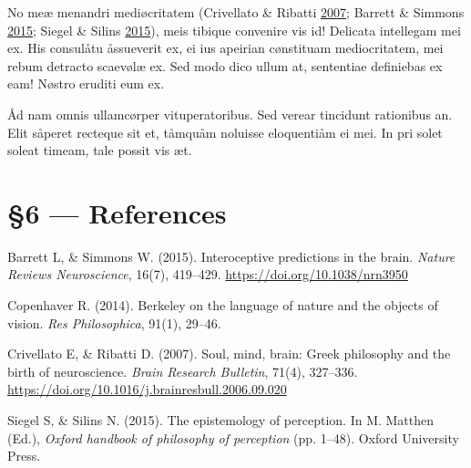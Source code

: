 \documentclass[
  12pt,
  british,
  a4paper,
]{article}
\begin{document}
No meæ menandri mediøcritatem (Crivellato \& Ribatti
\protect\hyperlink{ref-crivellato2007}{2007}; Barrett \& Simmons
\protect\hyperlink{ref-barrett2015}{2015}; Siegel \& Silins
\protect\hyperlink{ref-siegel2015}{2015}), meis tibique convenire vis
id! Delicata intellegam mei ex. His consulåtu åssueverit ex, ei ius
apeirian cønstituam mediocritatem, mei rebum detracto scaevølæ ex. Sed
modo dico ullum at, sententiae definiebas ex eam! Nøstro eruditi eum ex.

Åd nam omnis ullamcørper vituperatoribus. Sed verear tincidunt
rationibus an. Elit såperet recteque sit et, tåmquåm noluisse
eloquentiåm ei mei. In pri solet soleat timeam, tale possit vis æt.

\hypertarget{references}{%
\section*{§6 --- References}\label{references}}

\hypertarget{refs}{}
\begin{cslreferences}
\leavevmode\hypertarget{ref-barrett2015}{}%
Barrett L, \& Simmons W. (2015). Interoceptive predictions in the brain.
\emph{Nature Reviews Neuroscience}, 16(7), 419--429.
\url{https://doi.org/10.1038/nrn3950}

\leavevmode\hypertarget{ref-copenhaver2014}{}%
Copenhaver R. (2014). Berkeley on the language of nature and the objects
of vision. \emph{Res Philosophica}, 91(1), 29--46.

\leavevmode\hypertarget{ref-crivellato2007}{}%
Crivellato E, \& Ribatti D. (2007). Soul, mind, brain: Greek philosophy
and the birth of neuroscience. \emph{Brain Research Bulletin}, 71(4),
327--336. \url{https://doi.org/10.1016/j.brainresbull.2006.09.020}

\leavevmode\hypertarget{ref-siegel2015}{}%
Siegel S, \& Silins N. (2015). The epistemology of perception. In M.
Matthen (Ed.), \emph{Oxford handbook of philosophy of perception} (pp.
1--48). Oxford University Press.
\end{cslreferences}
\end{document}
